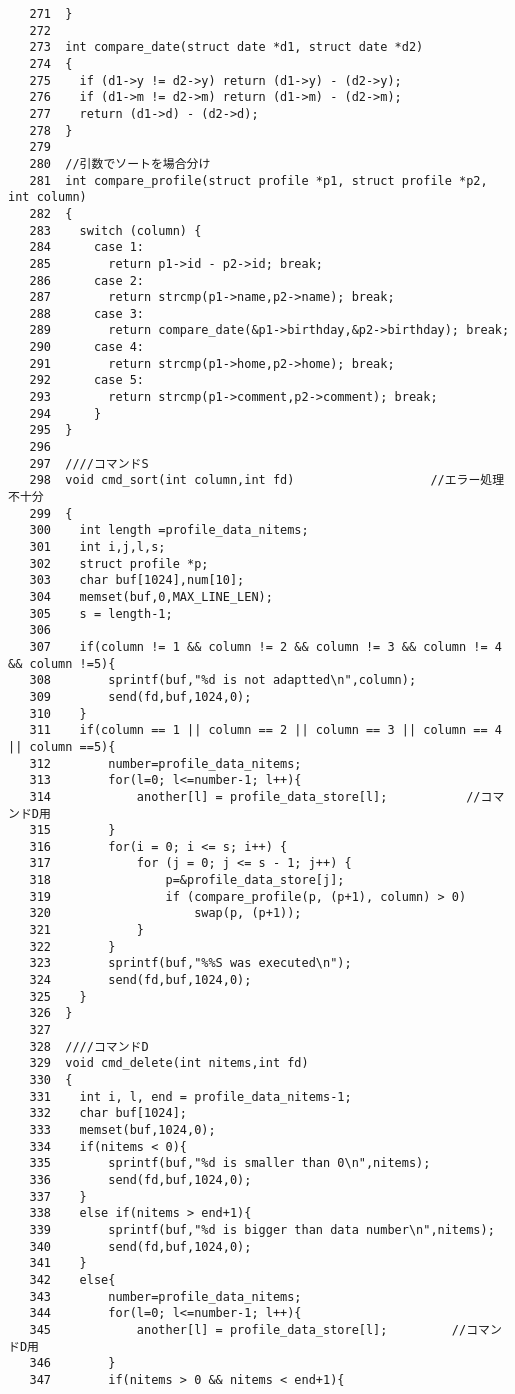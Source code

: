 \documentclass{jarticle}[11pt]
\begin{document}
\begin{itemize}
\begin{verbatim}
   271	}
   272	
   273	int compare_date(struct date *d1, struct date *d2)
   274	{
   275	  if (d1->y != d2->y) return (d1->y) - (d2->y);
   276	  if (d1->m != d2->m) return (d1->m) - (d2->m);
   277	  return (d1->d) - (d2->d);
   278	}
   279	
   280	//引数でソートを場合分け
   281	int compare_profile(struct profile *p1, struct profile *p2, int column)
   282	{
   283	  switch (column) {
   284	    case 1:
   285	      return p1->id - p2->id; break; 
   286	    case 2:
   287	      return strcmp(p1->name,p2->name); break;  
   288	    case 3:
   289	      return compare_date(&p1->birthday,&p2->birthday); break;  
   290	    case 4:
   291	      return strcmp(p1->home,p2->home); break;  
   292	    case 5:
   293	      return strcmp(p1->comment,p2->comment); break; 
   294	    }
   295	}
   296	
   297	////コマンドS
   298	void cmd_sort(int column,int fd)                   //エラー処理不十分
   299	{
   300	  int length =profile_data_nitems;
   301	  int i,j,l,s;
   302	  struct profile *p;
   303	  char buf[1024],num[10];
   304	  memset(buf,0,MAX_LINE_LEN);
   305	  s = length-1;
   306	
   307	  if(column != 1 && column != 2 && column != 3 && column != 4 && column !=5){
   308	      sprintf(buf,"%d is not adaptted\n",column);
   309	      send(fd,buf,1024,0);
   310	  } 
   311	  if(column == 1 || column == 2 || column == 3 || column == 4 || column ==5){
   312	      number=profile_data_nitems;
   313	      for(l=0; l<=number-1; l++){
   314	          another[l] = profile_data_store[l];           //コマンドD用
   315	      }
   316	      for(i = 0; i <= s; i++) {
   317	          for (j = 0; j <= s - 1; j++) {
   318	              p=&profile_data_store[j];
   319	              if (compare_profile(p, (p+1), column) > 0)
   320	                  swap(p, (p+1));  
   321	          }
   322	      }
   323	      sprintf(buf,"%%S was executed\n");
   324	      send(fd,buf,1024,0);
   325	  }
   326	}
   327	
   328	////コマンドD
   329	void cmd_delete(int nitems,int fd)
   330	{
   331	  int i, l, end = profile_data_nitems-1;
   332	  char buf[1024];
   333	  memset(buf,1024,0);
   334	  if(nitems < 0){
   335	      sprintf(buf,"%d is smaller than 0\n",nitems);
   336	      send(fd,buf,1024,0); 
   337	  } 
   338	  else if(nitems > end+1){
   339	      sprintf(buf,"%d is bigger than data number\n",nitems);
   340	      send(fd,buf,1024,0); 
   341	  }
   342	  else{
   343	      number=profile_data_nitems;
   344	      for(l=0; l<=number-1; l++){               
   345	          another[l] = profile_data_store[l];         //コマンドD用
   346	      }
   347	      if(nitems > 0 && nitems < end+1){

\end{verbatim}
\end{itemize}
\end{document}
